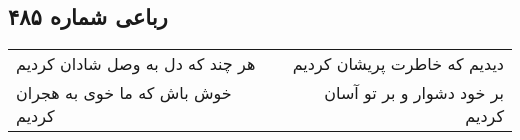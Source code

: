 \begin{center}
\section*{رباعی شماره ۴۸۵}
\label{sec:sh485}
\begin{longtable}{l p{0.5cm} r}
هر چند که دل به وصل شادان کردیم
&&
دیدیم که خاطرت پریشان کردیم
\\
خوش باش که ما خوی به هجران کردیم
&&
بر خود دشوار و بر تو آسان کردیم
\\
\end{longtable}
\end{center}
